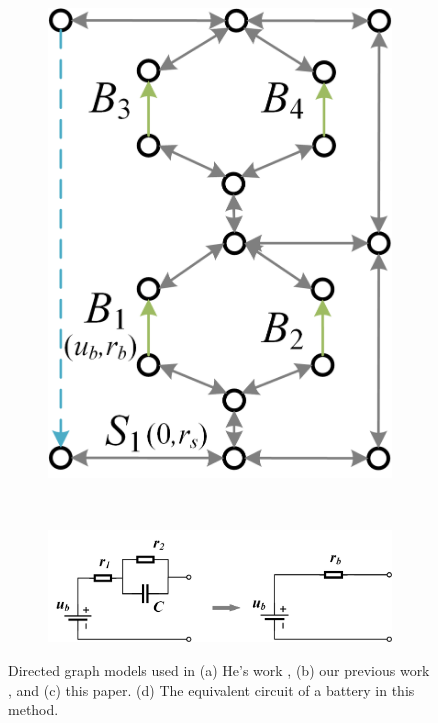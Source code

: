 \documentclass{article}
\begin{document}
\begin{figure}[htbp]
\begin{subfigure}[b]{0.24\textwidth}
        \includegraphics[width=\textwidth]{../attachments/direct-graph-my.png}
        \caption{}
        \label{fig:direct-graph-my}
    \end{subfigure}
    \\
    \begin{subfigure}[b]{0.8\textwidth}
        \includegraphics[width=\textwidth]{../attachments/battery_simple.png}
        \caption{}
        \label{fig:batter_simple}
    \end{subfigure}
    \caption{ 
        Directed graph models used in (a) He's work \cite{heExploringAdaptiveReconfiguration2013}, (b) our previous work , and (c) this paper.
        (d) The equivalent circuit of a battery in this method.
    }
\end{figure}
\end{document}
